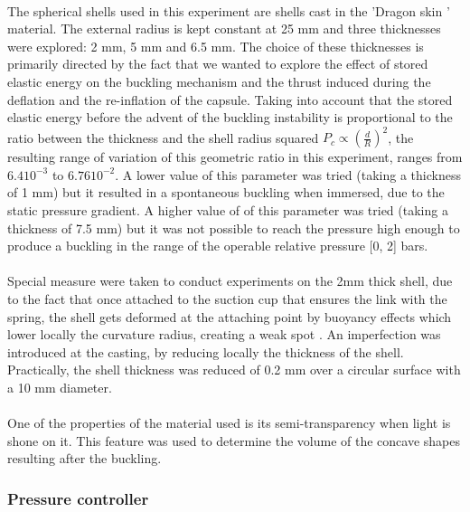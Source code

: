 \paragraph{}
The spherical shells used in this experiment are shells cast in the 'Dragon skin ' material. The external radius is kept constant at 25 mm and three thicknesses were explored: 2 mm, 5 mm and 6.5 mm.
The choice of these thicknesses is primarily directed by the fact that we wanted to explore the effect of stored elastic energy on the buckling mechanism and the thrust induced during the deflation and the re-inflation of the capsule. Taking into account that the stored elastic energy before the advent of the buckling instability is proportional to the ratio between the thickness and the shell radius squared \cite{cqpcritic2011} $P_c \propto (\frac{d}{R})^2$, the resulting range of variation of this geometric ratio in this experiment, ranges from $6.4 10^{-3}$ to $6.76 10^{-2}$.
A lower value of this parameter was tried (taking a thickness of 1 mm) but it resulted in a spontaneous buckling when immersed, due to the static pressure gradient.
A higher value of of this parameter was tried (taking a thickness of 7.5 mm) but it was not possible to reach the pressure high enough to produce a buckling in the range of the operable relative pressure [0, 2] bars.
\paragraph{}
Special measure were taken to conduct experiments on the 2mm thick shell, due to the fact that once attached to the suction cup that ensures the link with the spring, the shell gets deformed at the attaching point by buoyancy effects which lower locally the curvature radius, creating a weak spot \cite{cqpcritic2011}. An imperfection was introduced at the casting, by reducing locally the thickness of the shell. Practically, the shell thickness was reduced of 0.2 mm over a circular surface with a 10 mm diameter.
\paragraph{}
One of the properties of the material used is its semi-transparency when light is shone on it. This feature was used to determine the volume of the concave shapes resulting after the buckling.

\subsubsection{Pressure controller}
\label{sssection:pressure_controller}
